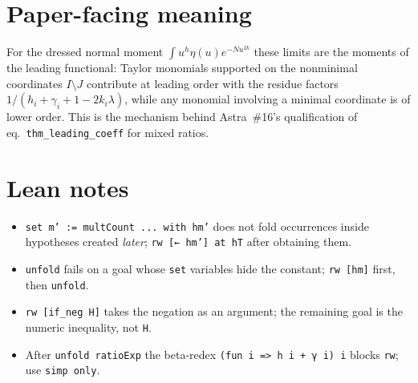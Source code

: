 \documentclass[11pt]{article}
\begin{document}
\section{Paper-facing meaning}
For the dressed normal moment $\int u^h\eta(u)e^{-Nu^{2k}}$ these limits are the moments of the
leading functional: Taylor monomials supported on the nonminimal coordinates $I\setminus J$
contribute at leading order with the residue factors $1/(h_i+\gamma_i+1-2k_i\lambda)$, while any
monomial involving a minimal coordinate is of lower order. This is the mechanism behind Astra~\#16's
qualification of eq.~\texttt{thm\_leading\_coeff} for mixed ratios.

\section{Lean notes}
\begin{itemize}
\item \texttt{set m' := multCount ... with hm'} does not fold occurrences inside hypotheses created
\emph{later}; \texttt{rw [← hm'] at hT} after obtaining them.
\item \texttt{unfold} fails on a goal whose \texttt{set} variables hide the constant; \texttt{rw [hm]}
first, then \texttt{unfold}.
\item \texttt{rw [if\_neg H]} takes the negation as an argument; the remaining goal is the numeric
inequality, not \texttt{H}.
\item After \texttt{unfold ratioExp} the beta-redex \texttt{(fun i => h i + γ i) i} blocks
\texttt{rw}; use \texttt{simp only}.
\end{itemize}
\end{document}
